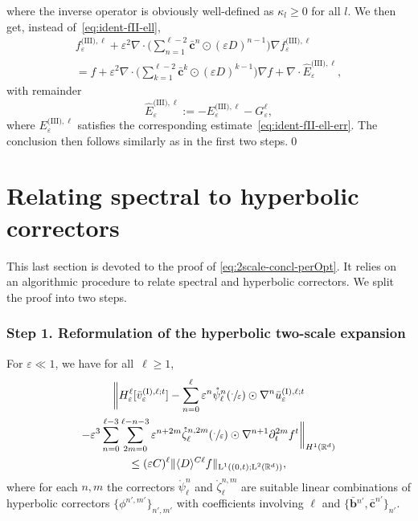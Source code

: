 \documentclass[10pt]{amsart}
\theoremstyle{plain}
\theoremstyle{definition}
\numberwithin{equation}{section}
\newcommand{\e}{\varepsilon}
\newcommand{\R}{\mathbb R}
\newcommand{\bb}{{\boldsymbol b}}
\newcommand{\cc}{{\boldsymbol c}}
\newcommand{\Ld}{\operatorname{L}}
\newcommand{\step}[1]{\subsubsection*{Step \textup #1}}
\begin{document}
where the inverse operator is obviously well-defined as $\kappa_l\ge0$ for all $l$.
We then get, instead of~\eqref{eq:ident-fII-ell},\vspace*{-5pt}
\begin{multline*}
f_\e^{\text{(III)},\ell}+\e^2\nabla\cdot\Big(\sum_{n=1}^{\ell-2}\bar\cc^n\odot(\e D)^{n-1}\Big)\nabla f_\e^{\text{(III)},\ell}\\[-8pt]
=f+\e^2\nabla\cdot\Big(\sum_{k=1}^{\ell-2}\bar\cc^k\odot(\e D)^{k-1}\Big)\nabla f+\nabla\cdot\hat E_\e^{\text{(III)},\ell},
\end{multline*}
with remainder\vspace*{-3pt}
\[\hat E_\e^{\text{(III)},\ell}:=-E_\e^{\text{(III)},\ell}-G_\e^{\ell},\]
where $E_\e^{\text{(III)},\ell}$ satisfies the corresponding estimate~\eqref{eq:ident-fII-ell-err}.
The conclusion then follows similarly as in the first two steps.\qed

\section{Relating spectral to hyperbolic correctors}\label{sec:fromGeom2Spec}

This last section is devoted to the proof of \eqref{eq:2scale-concl-perOpt}.
It relies on an algorithmic procedure to relate spectral and hyperbolic correctors. We split the proof into two steps.

\step{1. Reformulation of the hyperbolic two-scale expansion} For $\e\ll1$, we have for all~$\ell\ge1$,\vspace*{-8pt}
\begin{multline}\label{eq:tadam}
\bigg\|H^\ell_\e[\bar v_\e^{\text{(I)},\ell;t}]
-\sum_{n=0}^\ell\e^{n}\mathring\psi_\ell^{n}(\sfrac{\cdot}{\e})\odot\nabla^{n}\bar{u}^{\text{(I)},\ell;t}_{\e}
\\
-\e^3\sum_{n=0}^{\ell-3}\sum_{2m=0}^{\ell-n-3}\e^{n+2m}\mathring\zeta_\ell^{n,2m}(\sfrac\cdot\e)\odot \nabla^{n+1}\partial_t^{2m}f^t\bigg\|_{H^1(\R^d)}\\
\le (\e C)^{\ell}\|\langle D\rangle^{C\ell}f\|_{\Ld^1((0,t);\Ld^2(\R^d))},
\end{multline}
where for each $n,m$ the correctors $\mathring\psi_\ell^{n}$ and $\mathring\zeta_\ell^{n,m}$ are suitable linear combinations of hyperbolic correctors $\{\phi^{n',m'}\}_{n',m'}$ with coefficients involving $\ell$ and $\{\bar\bb{}^{n'},\bar\cc^{n'}\}_{n'}$.
\end{document}
